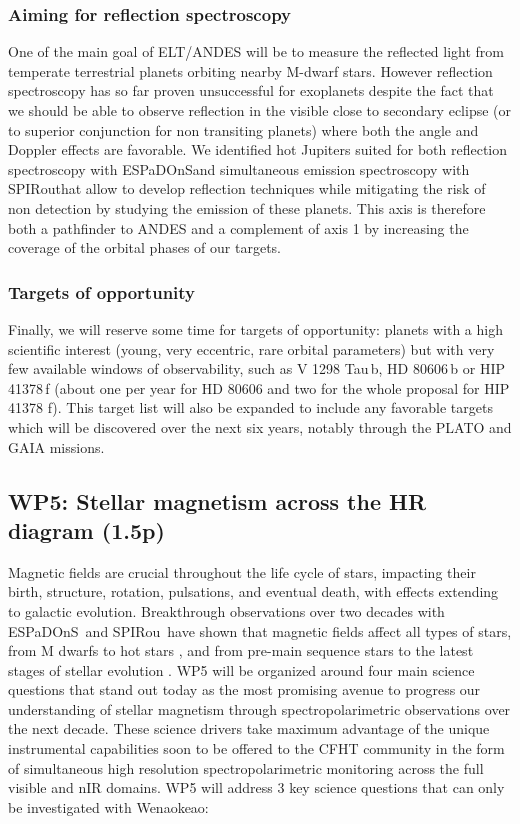 \documentclass[
    traditabstract,
    longauth,
    onecolumn,
]{aa}
\def \spi{SPIRou}
\def \esp{ESPaDOnS}
\def \wena{Wenaokeao}
\begin{document}
\subsubsection*{Aiming for reflection spectroscopy}
One of the main goal of ELT/ANDES will be to measure the reflected light from temperate terrestrial planets orbiting nearby M-dwarf stars. However reflection spectroscopy has so far proven unsuccessful for exoplanets despite the fact that we should be able to observe reflection  in the visible close to secondary eclipse (or to superior conjunction for non transiting planets) where both the angle and Doppler effects are favorable. We identified hot Jupiters suited for both reflection spectroscopy with \esp and simultaneous emission spectroscopy with \spi that allow to develop reflection techniques while mitigating the risk of non detection by studying the emission of these planets. This axis is therefore both a pathfinder to ANDES and a complement of axis 1 by increasing the coverage of the orbital phases of our targets. 

\subsubsection*{Targets of opportunity}
Finally, we will reserve some time for targets of opportunity: planets with a high scientific interest (young, very eccentric, rare orbital parameters) but with very few available windows of observability, such as V 1298 Tau\,b, HD 80606\,b or HIP 41378\,f (about one per year for HD 80606 and two for the whole proposal for HIP 41378 f). This target list will also be expanded to include any favorable targets which will be discovered over the next six years, notably through the PLATO and GAIA missions.

\subsection{WP5: Stellar magnetism across the HR diagram (1.5p)}

Magnetic fields are crucial throughout the life cycle of stars, impacting their birth, structure, rotation, pulsations, and eventual death, with effects extending to galactic evolution. Breakthrough observations over two decades with \esp\ and \spi\ have shown that magnetic fields affect all types of stars, from M dwarfs to hot stars \citep{wade_mimes_2016,sikora2019,bellotti_long-term_2024}, and from pre-main sequence stars to the latest stages of stellar evolution \citep{folsom_evolution_2016,barron_finding_2022}. WP5 will be organized around four main science questions that stand out today as the most promising avenue to progress our understanding of stellar magnetism through spectropolarimetric observations over the next decade. These science drivers take maximum advantage of the unique instrumental capabilities soon to be offered to the CFHT community in the form of simultaneous high resolution spectropolarimetric monitoring across the full visible and nIR domains. WP5 will address 3 key science questions that can only be investigated with \wena:\\
\end{document}
